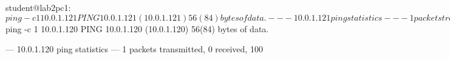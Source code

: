 student@lab2pc1:~$ ping -c 1 10.0.1.121
PING 10.0.1.121 (10.0.1.121) 56(84) bytes of data.

--- 10.0.1.121 ping statistics ---
1 packets transmitted, 0 received, 100%

student@lab2pc1:~$ ping -c 1 10.0.1.120
PING 10.0.1.120 (10.0.1.120) 56(84) bytes of data.

--- 10.0.1.120 ping statistics ---
1 packets transmitted, 0 received, 100%
